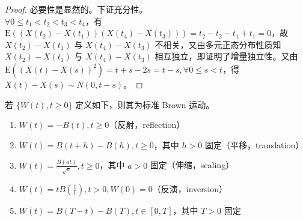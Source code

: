 \documentclass[../main.tex]{subfiles}
\begin{document}
\begin{proof}
    必要性是显然的。下证充分性。\\
    $\forall 0\leq t_1<t_2<t_3<t_4$，有 $\mathrm E((X(t_2)-X(t_1))(X(t_4)-X(t_3)))=t_2-t_2-t_1+t_1=0$，故 $X(t_2)-X(t_1)$ 与 $X(t_4)-X(t_3)$ 不相关，又由多元正态分布性质知 $X(t_2)-X(t_1)$ 与 $X(t_4)-X(t_3)$ 相互独立，即证明了增量独立性。又由 $\mathrm E((X(t)-X(s))^2)=t+s-2s=t-s,\forall0\leq s<t$，得 $X(t)-X(s)\sim N(0,t-s)$。
\end{proof}

\begin{proposition}
    若 $\{W(t),t\geq0\}$ 定义如下，则其为标准 Brown 运动。
    \begin{enumerate}
        \item $W(t)=-B(t),t\geq0$（反射，reflection）
        \item $W(t)=B(t+h)-B(h),t\geq0$，其中 $h>0$ 固定（平移，translation）
        \item $W(t)=\frac{B(at)}{\sqrt a},t\geq0$，其中 $a>0$ 固定（伸缩，scaling）
        \item $W(t)=tB(\frac1t),t>0,W(0)=0$（反演，inversion）
        \item $W(t)=B(T-t)-B(T),t\in[0,T]$，其中 $T>0$ 固定
    \end{enumerate}
\end{proposition}
\end{document}
